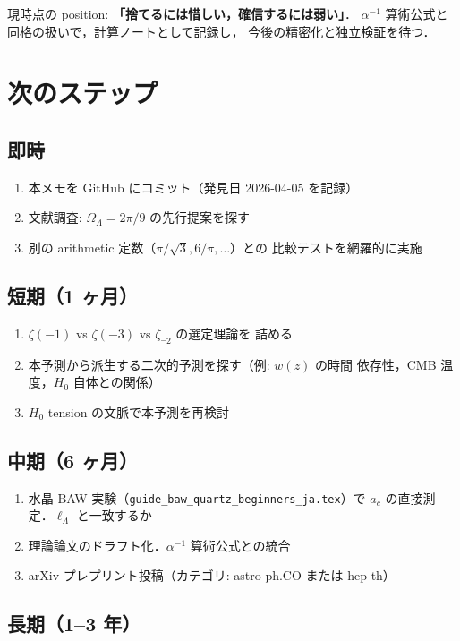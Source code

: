 \documentclass[11pt,a4paper]{article}
\begin{document}
現時点の position: \textbf{「捨てるには惜しい，確信するには弱い」}．
$\alpha^{-1}$ 算術公式と同格の扱いで，計算ノートとして記録し，
今後の精密化と独立検証を待つ．

\section{次のステップ}

\subsection{即時}

\begin{enumerate}
\item 本メモを GitHub にコミット（発見日 2026-04-05 を記録）
\item 文献調査: $\Omega_\Lambda = 2\pi/9$ の先行提案を探す
\item 別の arithmetic 定数（$\pi/\sqrt{3}, 6/\pi,\ldots$）との
比較テストを網羅的に実施
\end{enumerate}

\subsection{短期（1 ヶ月）}

\begin{enumerate}
\item $\zeta(-1)$ vs $\zeta(-3)$ vs $\zeta_{\neg 2}$ の選定理論を
詰める
\item 本予測から派生する二次的予測を探す（例: $w(z)$ の時間
依存性，CMB 温度，$H_0$ 自体との関係）
\item $H_0$ tension の文脈で本予測を再検討
\end{enumerate}

\subsection{中期（6 ヶ月）}

\begin{enumerate}
\item 水晶 BAW 実験（\texttt{guide\_baw\_quartz\_beginners\_ja.tex}）で
$a_c$ の直接測定．$\ell_\Lambda$ と一致するか
\item 理論論文のドラフト化．$\alpha^{-1}$ 算術公式との統合
\item arXiv プレプリント投稿（カテゴリ: astro-ph.CO または hep-th）
\end{enumerate}

\subsection{長期（1--3 年）}
\end{document}
